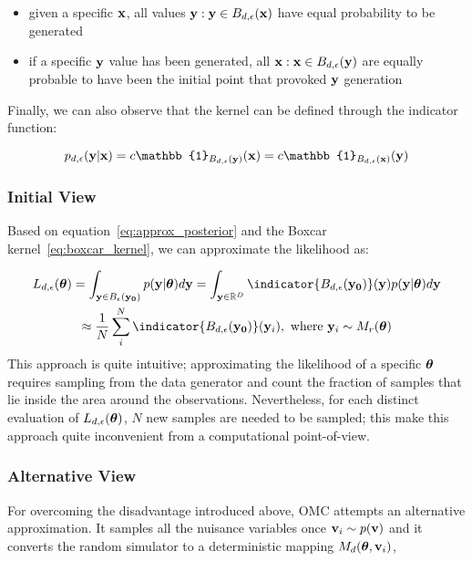 \begin{itemize}
\item given a specific $\mathbf{x}$, all values
  $\mathbf{y}: \mathbf{y} \in B_{d,\epsilon}(\mathbf{x})$ have equal probability to be
  generated
\item if a specific $\mathbf{y}$ value has been generated, all
  $\mathbf{x}: \mathbf{x} \in B_{d,\epsilon}(\mathbf{y})$ are equally probable to have been
  the initial point that provoked $\mathbf{y}$ generation
\end{itemize}
%
Finally, we can also observe that the kernel can be defined through
the indicator function:

\begin{equation}
  p_{d,\epsilon}(\yb|\xb) = c \mathbb{1}_{B_{d,\epsilon}(\yb)}(\xb) = c \mathbb{1}_{B_{d,\epsilon}(\xb)}(\yb)
\end{equation}

\subsubsection*{Initial View}

Based on equation~\ref{eq:approx_posterior} and the Boxcar kernel~\ref{eq:boxcar_kernel}, we can approximate the likelihood as:

\begin{gather} \label{eq:primal_view}
  L_{d, \epsilon}(\thetab) =
  \int_{\yb \in B_\epsilon(\data)}p(\yb|\thetab)d\yb =
  \int_{\yb \in \R^D} \indicator{\region(\data)}(\yb)p(\yb|\thetab)d\yb\\
  \approx \frac{1}{N} \sum_i^N \indicator{\region(\data)}(\yb_i),\text{ where }
  \yb_i \sim M_r(\thetab)
\end{gather}
%
This approach is quite intuitive; approximating the likelihood of a
specific $\boldsymbol{\theta}$ requires sampling from the data generator and count
the fraction of samples that lie inside the area around the
observations.  Nevertheless, for each distinct evaluation of
$L_{d,\epsilon}(\boldsymbol{\theta})$, $N$ new samples are needed to be sampled;
this make this approach quite inconvenient from a computational
point-of-view.

\subsubsection*{Alternative View}

For overcoming the disadvantage introduced above, OMC attempts an
alternative approximation. It samples all the nuisance variables once
$\mathbf{v}_i \sim p(\mathbf{v})$ and it converts the random simulator to a
deterministic mapping $M_d(\boldsymbol{\theta}, \mathbf{v}_i)$,

